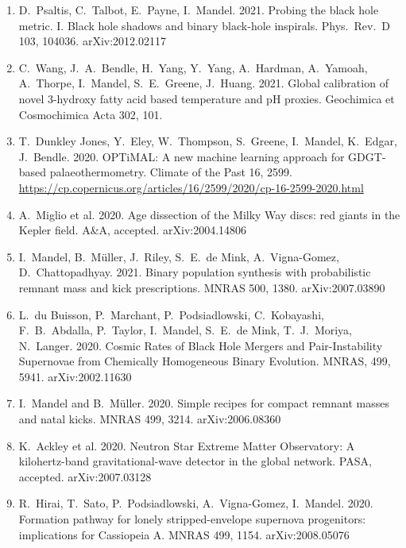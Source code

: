 \documentclass[margin,line]{res}
\begin{document}
\begin{resume}
\begin{enumerate}
\item D.~Psaltis, C.~Talbot, E.~Payne, I.~Mandel.  2021. Probing the black hole metric. I. Black hole shadows and binary black-hole inspirals.  Phys.~Rev.~D 103, 104036. arXiv:2012.02117

\item C.~Wang, J.~A.~Bendle,  H.~Yang, Y.~Yang, A.~Hardman, A.~Yamoah, A.~Thorpe, I.~Mandel, S.~E.~Greene, J.~Huang.  2021. Global calibration of novel 3-hydroxy fatty acid based temperature and pH proxies.  Geochimica et Cosmochimica Acta 302, 101. 

\item T.~Dunkley Jones, Y.~Eley, W.~Thompson, S.~Greene, I.~Mandel, K.~Edgar, J.~Bendle.  2020.  OPTiMAL: A new machine learning approach for GDGT-based palaeothermometry.  Climate of the Past 16, 2599.  \url{https://cp.copernicus.org/articles/16/2599/2020/cp-16-2599-2020.html}

\item A.~Miglio et al. 2020. Age dissection of the Milky Way discs: red giants in the Kepler field.  A\&A, accepted.  arXiv:2004.14806

\item I.~Mandel, B.~M\"{u}ller, J.~Riley, S.~E.~de Mink, A.~Vigna-Gomez, D.~Chattopadhyay. 2021.  Binary population synthesis with probabilistic remnant mass and kick prescriptions. MNRAS 500, 1380.   arXiv:2007.03890

\item L.~du Buisson, P.~Marchant, P.~Podsiadlowski, C.~Kobayashi, F.~B.~Abdalla, P.~Taylor, I.~Mandel, S.~E.~de Mink, T.~J.~Moriya, N.~Langer.  2020. Cosmic Rates of Black Hole Mergers and Pair-Instability Supernovae from Chemically Homogeneous Binary Evolution. MNRAS, 499, 5941.  arXiv:2002.11630

\item I.~Mandel and B.~M\"{u}ller. 2020. Simple recipes for compact remnant masses and natal kicks.  MNRAS 499, 3214.  arXiv:2006.08360

\item K.~Ackley et al. 2020. Neutron Star Extreme Matter Observatory: A kilohertz-band gravitational-wave detector in the global network. PASA, accepted.  arXiv:2007.03128 

\item R.~Hirai, T.~Sato, P.~Podsiadlowski, A.~Vigna-Gomez, I.~Mandel. 2020. Formation pathway for lonely stripped-envelope supernova progenitors: implications for Cassiopeia A.  MNRAS 499, 1154. arXiv:2008.05076


\end{enumerate}
\end{resume}
\end{document}
